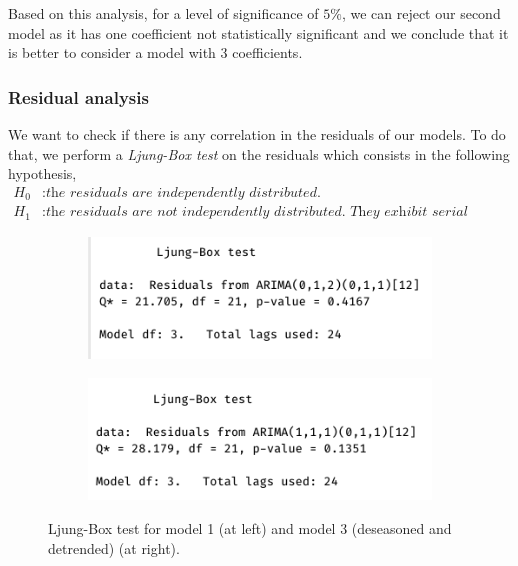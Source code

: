Based on this analysis, for a level of significance of $5\%$, we can reject our second model as it has one coefficient not statistically significant and we conclude that it is better to consider a model with $3$ coefficients.

\subsubsection{Residual analysis}

We want to check if there is any correlation in the residuals of our models. To do that, we perform a \textit{Ljung-Box test} on the residuals which consists in the following hypothesis,
\begin{align*}
	H_0&: \textit{the residuals are independently distributed.} \\
	H_1&: \textit{the residuals are not independently distributed. They exhibit serial correlation instead.}
\end{align*}


\begin{figure}[H]
	\centering
	\begin{subfigure}{0.49\textwidth}
		\centering
		\includegraphics[width=\textwidth]{figures/box_jenkins/ljung_box_test_model1.png}
		\label{fig:ljung-box-test-model1}
	\end{subfigure}
	\begin{subfigure}{0.49\textwidth}
		\centering
		\includegraphics[width=\textwidth]{figures/box_jenkins//ljung_box_test_model3.png}
		\label{fig:ljung-box-test-model3}
	\end{subfigure}
	\caption{Ljung-Box test for model 1 (at left) and model 3 (deseasoned and detrended) (at right).}
\end{figure}

